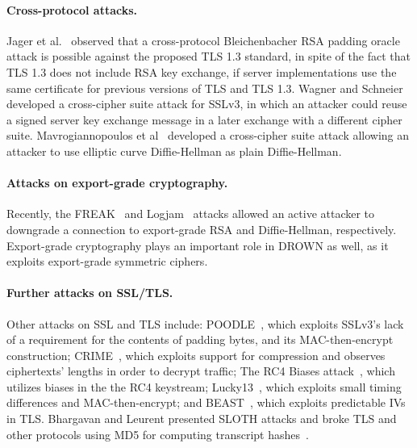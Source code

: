 \paragraph{Cross-protocol attacks.}

Jager et al.~\cite{Jager:2015:STQ:2810103.2813657} observed that a cross-protocol Bleichenbacher RSA padding oracle attack is possible against the proposed TLS 1.3 standard, in spite of the fact that TLS 1.3 does not include RSA key exchange, if server implementations use the same certificate for previous versions of TLS and TLS 1.3.  Wagner and Schneier~\cite{WagnerSchneier:SSLAnalysis:96} developed a cross-cipher suite attack for SSLv3, in which an attacker could reuse a signed server key exchange message in a later exchange with a different cipher suite.  Mavrogiannopoulos et al~\cite{CCS:MVVP12} developed a cross-cipher suite attack allowing an attacker to use elliptic curve Diffie-Hellman as plain Diffie-Hellman.

\paragraph{Attacks on export-grade cryptography.}
Recently, the FREAK~\cite{SMACKTLS} and Logjam~\cite{LogJam} attacks allowed an active attacker to downgrade a connection to export-grade RSA and Diffie-Hellman, respectively.
Export-grade cryptography plays an important role in DROWN as well, as it exploits export-grade symmetric ciphers.

\paragraph{Further attacks on SSL/TLS\@.}
Other attacks on SSL and TLS include:
POODLE~\cite{POODLE}, which exploits SSLv3's lack of a requirement for the contents of padding bytes, and its MAC-then-encrypt construction;
CRIME~\cite{CRIME}, which exploits support for compression and observes ciphertexts' lengths in order to decrypt traffic;
The RC4 Biases attack~\cite{RC4biases}, which utilizes biases in the the RC4 keystream;
Lucky13~\cite{Lucky13}, which exploits small timing differences and MAC-then-encrypt;
and BEAST~\cite{BEAST}, which exploits predictable IVs in TLS\@.
 Bhargavan and Leurent presented SLOTH attacks and broke TLS and other protocols using MD5 for computing transcript hashes~\cite{SLOTH}.

